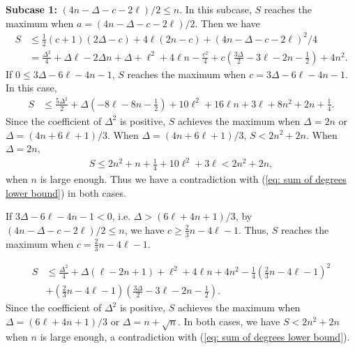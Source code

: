 \documentclass[12pt]{article}%
\begin{document}
	\textbf{Subcase 1:} $(4n-\Delta -c- 2\ell)/2 \le n$.
	In this subcase, $S$ reaches the maximum when $a=(4n-\Delta-c-2\ell)/2$. Then we have
	\begin{equation*}
	\begin{aligned}
		S &\le \frac{1}{2}(c+1)(2\Delta - c) + 4\ell(2n-c) + {(4n-\Delta -c- 2\ell)}^2/4\\
		&= \frac{\Delta^{2}}{4} + \Delta \ell - 2 \Delta n + \Delta + \ell^{2} + 4 \ell n - \frac{c^{2}}{4} + c \left(\frac{3 \Delta}{2} - 3 \ell - 2 n - \frac{1}{2}\right) + 4 n^{2}.
	\end{aligned}
	\end{equation*}
If $0\le 3\Delta - 6\ell - 4n -1 $,
$S$ reaches the maximum when $c = 3\Delta - 6\ell - 4n -1$.
In this case,
\begin{equation*}
\begin{aligned}
	S & \le \frac{5 \Delta^{2}}{2} + \Delta \left(- 8 \ell - 8 n - \frac{1}{2}\right) + 10 \ell^{2} + 16 \ell n + 3 \ell + 8 n^{2} + 2 n + \frac{1}{4}.
\end{aligned}
\end{equation*}
Since the coefficient of $\Delta^2$ is positive, $S$ achieves the maximum when $\Delta = 2n$ or $\Delta = (4n+6\ell+1)/3$.
When $\Delta = (4n+6\ell+1)/3$, $S < 2n^2 +2n$.
When $\Delta = 2n$,
\begin{equation*}
\begin{aligned}
	S \le 2 n^{2} + n + \frac{1}{4} + 10 \ell^{2} + 3 \ell<2n^2 + 2n,
\end{aligned}
\end{equation*}
 when $n$ is large enough. Thus we have a contradiction  with (\ref{eq: sum of degrees lower bound}) in both cases.

If $3\Delta - 6\ell - 4n -1 < 0$, i.e. $\Delta>(6\ell+4n+1)$/3, by $(4n-\Delta-c-2\ell)/2 \le n$, we have $c \ge \frac{2}{3}n-4\ell-1$.
Thus, $S$ reaches the maximum when $c = \frac{2}{3}n-4\ell-1$.

\begin{equation*}
\begin{aligned}
	S & \le \frac{\Delta^{2}}{4} + \Delta \left(\ell - 2 n + 1\right) + \ell^{2} + 4 \ell n + 4 n^{2}-\frac{1}{4}\left(\frac{2}{3}n-4\ell-1\right)^2\\
	&+\left(\frac{2}{3}n-4\ell-1\right)\left(\frac{3\Delta}{2}-3\ell-2n-\frac{1}{2}\right).
\end{aligned}
\end{equation*}
Since the coefficient of $\Delta^2$ is positive, $S$ achieves the maximum when $\Delta = (6\ell + 4n +1)/3$ or $\Delta=n+\sqrt{n}$.
In both cases, we have $S < 2n^2 + 2n$ when $n$ is large enough, a contradiction  with (\ref{eq: sum of degrees lower bound}).
\end{document}
